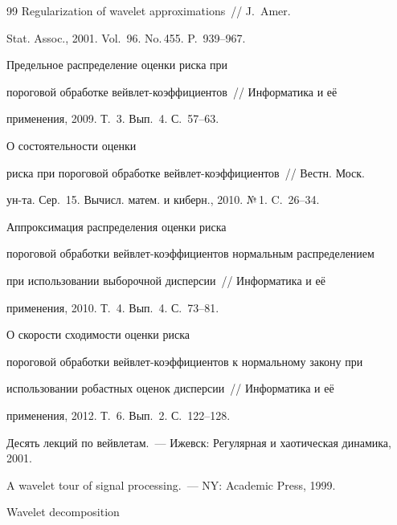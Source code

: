 {{\begin{thebibliography}{99}
 Regularization of wavelet approximations~/\!\!/ J.~Amer. 

Stat. Assoc., 2001. Vol.~96. No.\,455. P.~939--967.




 Предельное распределение оценки риска при

пороговой обработке вейвлет-коэффициентов~/\!\!/ Информатика и её

применения, 2009. Т.~3. Вып.~4. С.~57--63.




 О состоятельности оценки

риска при пороговой обработке вейв\-лет-коэффициентов~/\!\!/ Вестн. Моск.

ун-та. Сер.~15. Вычисл. матем. и киберн., 2010. №\,1. C.~26--34.




 Аппроксимация распределения оценки риска

пороговой обработки вейвлет-ко\-эф\-фи\-циентов нормальным распределением

при использовании выборочной дисперсии~/\!\!/ Информатика и её

применения, 2010. Т.~4. Вып.~4. С.~73--81.




 О скорости сходимости оценки риска

пороговой обработки вейвлет-коэффициентов к нормальному закону при

использовании робастных оценок дисперсии~/\!\!/ Информатика и её

применения, 2012. Т.~6. Вып.~2. С.~122--128.




 Десять лекций по вейвлетам.~--- Ижевск: Регулярная и хаотическая динамика, 2001.




 A wavelet tour of signal processing.~--- NY: Academic Press, 1999.




 Wavelet decomposition


\end{thebibliography}}}
